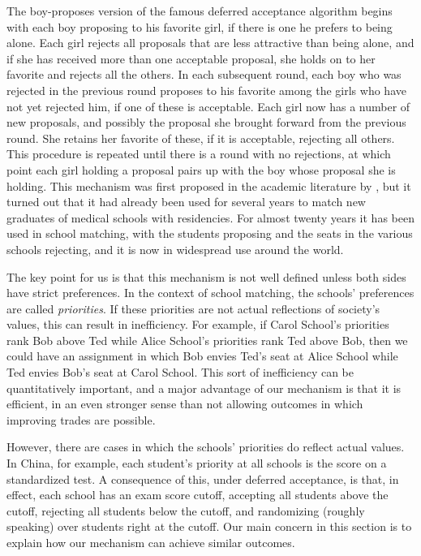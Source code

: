 \documentclass[12pt]{article}
\theoremstyle{definition}
\begin{document}
The boy-proposes version of the famous deferred acceptance algorithm
begins with each boy proposing to his favorite girl, if there is one
he prefers to being alone.  Each girl rejects all proposals that are
less attractive than being alone, and if she has received more than
one acceptable proposal, she holds on to her favorite and rejects all
the others.  In each subsequent round, each boy who was rejected in
the previous round proposes to his favorite among the girls who have
not yet rejected him, if one of these is acceptable. Each girl now has
a number of new proposals, and possibly the proposal she brought
forward from the previous round.  She retains her favorite of these,
if it is acceptable, rejecting all others.  This procedure is repeated
until there is a round with no rejections, at which point each girl
holding a proposal pairs up with the boy whose proposal she is
holding. This mechanism was first proposed in the academic literature
by \cite{GaSh62}, but it turned out that it had already been used for
several years to match new graduates of medical schools with
residencies.  For almost twenty years it has been used in school
matching, with the students proposing and the seats in the various
schools rejecting, and it is now in widespread use around the world.

The key point for us is that this mechanism is not well defined unless
both sides have strict preferences.  In the context of school
matching, the schools' preferences are called \emph{priorities}.  If
these priorities are not actual reflections of society's values, this
can result in inefficiency.  For example, if Carol School's priorities
rank Bob above Ted while Alice School's priorities rank Ted above Bob,
then we could have an assignment in which Bob envies Ted's seat at
Alice School while Ted envies Bob's seat at Carol School.  This sort
of inefficiency can be quantitatively important, and a major advantage
of our mechanism is that it is efficient, in an even stronger sense
than not allowing outcomes in which improving trades are possible.

However, there are cases in which the schools' priorities do reflect
actual values.  In China, for example, each student's priority at all
schools is the score on a standardized test.  A consequence of this,
under deferred acceptance, is that, in effect, each school has an exam
score cutoff, accepting all students above the cutoff, rejecting all
students below the cutoff, and randomizing (roughly speaking) over
students right at the cutoff.  Our main concern in this section is to
explain how our mechanism can achieve similar outcomes.
\end{document}
